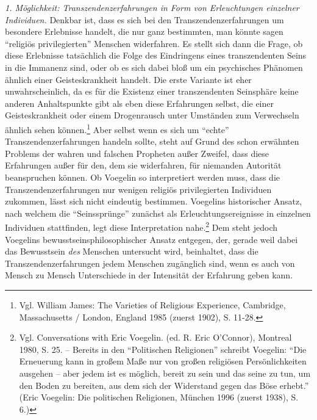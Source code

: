 {\it 1. Möglichkeit: Transzendenzerfahrungen in Form von Erleuchtungen
  einzelner Individuen.} Denkbar ist, dass es sich bei den
Transzendenzerfahrungen um besondere Erlebnisse handelt, die nur ganz
bestimmten, man könnte sagen "`religiös privilegierten"' Menschen widerfahren.
Es stellt sich dann die Frage, ob diese Erlebnisse tatsächlich die Folge des
Eindringens eines transzendenten Seins in die Immanenz sind, oder ob es sich
dabei bloß um ein psychisches Phänomen ähnlich einer Geisteskrankheit handelt.
Die erste Variante ist eher unwahrscheinlich, da es für die Existenz einer
transzendenten Seinsphäre keine anderen Anhaltspunkte gibt als eben diese
Erfahrungen selbst, die einer Geisteskrankheit oder einem Drogenrausch unter
Umständen zum Verwechseln ähnlich sehen können.\footnote{Vgl. William James:
  The Varieties of Religious Experience, Cambridge, Massachusetts / London,
  England 1985 (zuerst 1902), S. 11-28.}  Aber selbst wenn es sich um
"`echte"' Transzendenzerfahrungen handeln sollte, steht auf Grund des schon
erwähnten Problems der wahren und falschen Propheten außer Zweifel, dass diese
Erfahrungen außer für den, dem sie widerfahren, für niemanden Autorität
beanspruchen können. Ob Voegelin so interpretiert werden muss, dass die
Transzendenzerfahrungen nur wenigen religiös privilegierten Individuen
zukommen, lässt sich nicht eindeutig bestimmen. Voegelins historischer Ansatz,
nach welchem die "`Seinssprünge"' zunächst als Erleuchtungsereignisse in
einzelnen Individuen stattfinden, legt diese Interpretation
nahe.\footnote{Vgl.  Conversations with Eric Voegelin. (ed. R.  Eric
  O'Connor), Montreal 1980, S. 25. -- Bereits in den "`Politischen
  Religionen"' schreibt Voegelin: "`Die Erneuerung kann in großem Maße nur von
  großen religiösen Persönlichkeiten ausgehen -- aber jedem ist es möglich,
  bereit zu sein und das seine zu tun, um den Boden zu bereiten, aus dem sich
  der Widerstand gegen das Böse erhebt."' (Eric Voegelin: Die politischen
  Religionen, München 1996 (zuerst 1938), S. 6.)} Dem steht jedoch Voegelins
bewusstseinsphilosophischer Ansatz entgegen, der, gerade weil dabei das
Bewusstsein {\it des} Menschen untersucht wird, beinhaltet, dass die
Transzendenzerfahrungen jedem Menschen zugänglich sind, wenn es auch von
Mensch zu Mensch Unterschiede in der Intensität der Erfahrung geben kann.

